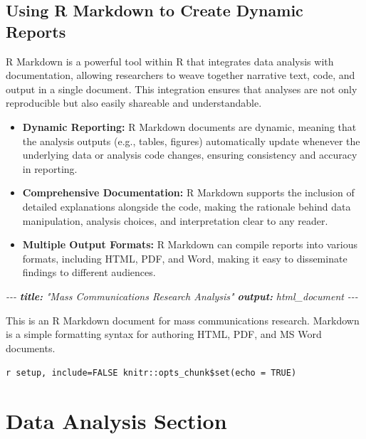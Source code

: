 \documentclass[
]{book}
\newenvironment{Shaded}{\begin{snugshade}}{\end{snugshade}}
\newcommand{\AnnotationTok}[1]{\textcolor[rgb]{0.56,0.35,0.01}{\textbf{\textit{#1}}}}
\newcommand{\CommentTok}[1]{\textcolor[rgb]{0.56,0.35,0.01}{\textit{#1}}}
\begin{document}
\hypertarget{using-r-markdown-to-create-dynamic-reports}{%
\subsection*{Using R Markdown to Create Dynamic Reports}\label{using-r-markdown-to-create-dynamic-reports}}

R Markdown is a powerful tool within R that integrates data analysis with documentation, allowing researchers to weave together narrative text, code, and output in a single document. This integration ensures that analyses are not only reproducible but also easily shareable and understandable.

\begin{itemize}
\item
  \textbf{Dynamic Reporting:} R Markdown documents are dynamic, meaning that the analysis outputs (e.g., tables, figures) automatically update whenever the underlying data or analysis code changes, ensuring consistency and accuracy in reporting.
\item
  \textbf{Comprehensive Documentation:} R Markdown supports the inclusion of detailed explanations alongside the code, making the rationale behind data manipulation, analysis choices, and interpretation clear to any reader.
\item
  \textbf{Multiple Output Formats:} R Markdown can compile reports into various formats, including HTML, PDF, and Word, making it easy to disseminate findings to different audiences.
\end{itemize}

\begin{Shaded}
\begin{Highlighting}[]
\CommentTok{{-}{-}{-}}
\AnnotationTok{title:}\CommentTok{ "Mass Communications Research Analysis"}
\AnnotationTok{output:}\CommentTok{ html\_document}
\CommentTok{{-}{-}{-}}
\end{Highlighting}
\end{Shaded}

This is an R Markdown document for mass communications research. Markdown is a simple formatting syntax for authoring HTML, PDF, and MS Word documents.

\texttt{r\ setup,\ include=FALSE\ knitr::opts\_chunk\$set(echo\ =\ TRUE)}

\hypertarget{data-analysis-section}{%
\section{Data Analysis Section}\label{data-analysis-section}}
\end{document}
